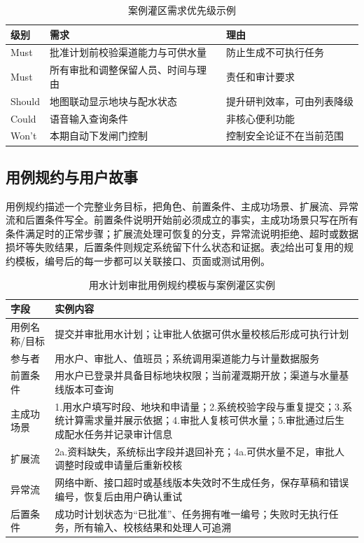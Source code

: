 \begin{table}[htbp]
\centering
\caption{案例灌区需求优先级示例}
\label{tab:moscow-example}
\begin{tabular}{p{2.0cm}p{6.6cm}p{4.0cm}}
\toprule
级别 & 需求 & 理由 \\
\midrule
Must & 批准计划前校验渠道能力与可供水量 & 防止生成不可执行任务 \\
Must & 所有审批和调整保留人员、时间与理由 & 责任和审计要求 \\
Should & 地图联动显示地块与配水状态 & 提升研判效率，可由列表降级 \\
Could & 语音输入查询条件 & 非核心便利功能 \\
Won't & 本期自动下发闸门控制 & 控制安全论证不在当前范围 \\
\bottomrule
\end{tabular}
\end{table}

\subsection{用例规约与用户故事}

用例规约描述一个完整业务目标，把角色、前置条件、主成功场景、扩展流、异常流和后置条件写全。前置条件说明开始前必须成立的事实，主成功场景只写在所有条件满足时的正常步骤；扩展流处理可恢复的分支，异常流说明拒绝、超时或数据损坏等失败结果，后置条件则规定系统留下什么状态和证据。表\ref{tab:ch02-usecase-template}给出可复用的规约模板，编号后的每一步都可以关联接口、页面或测试用例。

\begin{table}[htbp]
\centering
\caption{用水计划审批用例规约模板与案例灌区实例}
\label{tab:ch02-usecase-template}
\begin{tabular}{p{2.6cm}p{10.0cm}}
\toprule
字段 & 实例内容 \\
\midrule
用例名称/目标 & 提交并审批用水计划；让审批人依据可供水量校核后形成可执行计划 \\
参与者 & 用水户、审批人、值班员；系统调用渠道能力与计量数据服务 \\
前置条件 & 用水户已登录并具备目标地块权限；当前灌溉期开放；渠道与水量基线版本可查询 \\
主成功场景 & 1.用水户填写时段、地块和申请量；2.系统校验字段与重复提交；3.系统计算需求量并展示依据；4.审批人复核可供水量；5.审批通过后生成配水任务并记录审计信息 \\
扩展流 & 2a.资料缺失，系统标出字段并退回补充；4a.可供水量不足，审批人调整时段或申请量后重新校核 \\
异常流 & 网络中断、接口超时或基线版本失效时不生成任务，保存草稿和错误编号，恢复后由用户确认重试 \\
后置条件 & 成功时计划状态为“已批准”、任务拥有唯一编号；失败时无执行任务，所有输入、校核结果和处理人可追溯 \\
\bottomrule
\end{tabular}
\end{table}


